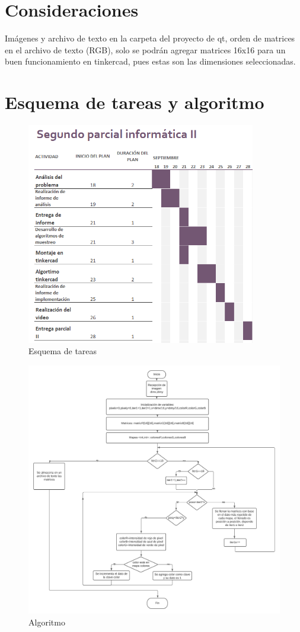 \documentclass{article}
\begin{document}
\section{Consideraciones}\label{cons}
Imágenes y archivo de texto en la carpeta del proyecto de qt, orden de matrices en el archivo de texto (RGB), solo se podrán agregar matrices 16x16 para un buen funcionamiento en tinkercad, pues estas son las dimensiones seleccionadas.
\section{Esquema de tareas y algoritmo}\label{ta}
\begin{figure}[h]
\includegraphics[width=10cm]{Esquema de tareas.PNG}
\centering
\caption{Esquema de tareas}
\label{fig:Esquema de tareas}
\end{figure}

\begin{figure}[h]
\includegraphics[width=12cm]{Algoritmo.jpeg}
\centering
\caption{Algoritmo}
\label{fig:Esquema de tareas}
\end{figure}
\end{document}
